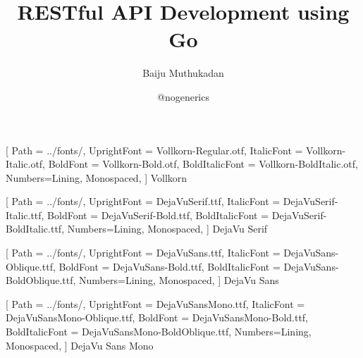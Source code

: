\documentclass[aspectratio=169]{beamer}
\title{RESTful API Development using Go}
\author{Baiju Muthukadan}
\date{@nogenerics}
\begin{document}
\beamertemplatenavigationsymbolsempty

\setmainfont
[ Path = ../fonts/,
UprightFont = DejaVuSerif.ttf,
ItalicFont = DejaVuSerif-Italic.ttf,
BoldFont = DejaVuSerif-Bold.ttf,
BoldItalicFont = DejaVuSerif-BoldItalic.ttf,
Numbers={Lining, Monospaced},
] {DejaVu Serif}

\setsansfont
[ Path = ../fonts/,
UprightFont = DejaVuSans.ttf,
ItalicFont = DejaVuSans-Oblique.ttf,
BoldFont = DejaVuSans-Bold.ttf,
BoldItalicFont = DejaVuSans-BoldOblique.ttf,
Numbers={Lining, Monospaced},
] {DejaVu Sans}

\setmonofont
[ Path = ../fonts/,
UprightFont = DejaVuSansMono.ttf,
ItalicFont = DejaVuSansMono-Oblique.ttf,
BoldFont = DejaVuSansMono-Bold.ttf,
BoldItalicFont = DejaVuSansMono-BoldOblique.ttf,
Numbers={Lining, Monospaced},
] {DejaVu Sans Mono}


\newfontfamily{\vollkorn}
[ Path = ../fonts/,
UprightFont = Vollkorn-Regular.otf,
ItalicFont = Vollkorn-Italic.otf,
BoldFont = Vollkorn-Bold.otf,
BoldItalicFont = Vollkorn-BoldItalic.otf,
Numbers={Lining, Monospaced},
] {Vollkorn}

\newfontfamily{\dejavuserif}
[ Path = ../fonts/,
UprightFont = DejaVuSerif.ttf,
ItalicFont = DejaVuSerif-Italic.ttf,
BoldFont = DejaVuSerif-Bold.ttf,
BoldItalicFont = DejaVuSerif-BoldItalic.ttf,
Numbers={Lining, Monospaced},
] {DejaVu Serif}

\newfontfamily{\dejavusans}
[ Path = ../fonts/,
UprightFont = DejaVuSans.ttf,
ItalicFont = DejaVuSans-Oblique.ttf,
BoldFont = DejaVuSans-Bold.ttf,
BoldItalicFont = DejaVuSans-BoldOblique.ttf,
Numbers={Lining, Monospaced},
] {DejaVu Sans}

\newfontfamily{\dejavumono}
[ Path = ../fonts/,
UprightFont = DejaVuSansMono.ttf,
ItalicFont = DejaVuSansMono-Oblique.ttf,
BoldFont = DejaVuSansMono-Bold.ttf,
BoldItalicFont = DejaVuSansMono-BoldOblique.ttf,
Numbers={Lining, Monospaced},
] {DejaVu Sans Mono}

\frame{\titlepage}
\end{document}
